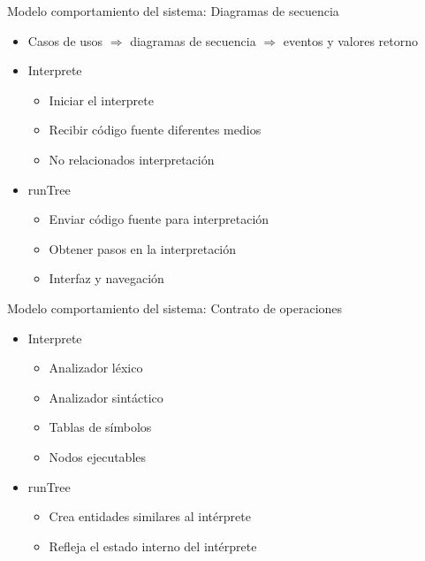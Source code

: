 \documentclass[spanish]{beamer}
\begin{document}
\begin{frame}{Modelo comportamiento del sistema: Diagramas de secuencia}
   \begin{itemize}
      \item Casos de usos $\Rightarrow$ diagramas de secuencia $\Rightarrow$ eventos y valores retorno
      \item Interprete
      \begin{itemize}
         \item Iniciar el interprete
         \item Recibir código fuente diferentes medios
         \item No relacionados interpretación
      \end{itemize}
      \item runTree
      \begin{itemize}
         \item Enviar código fuente para interpretación
         \item Obtener pasos en la interpretación 
         \item Interfaz y navegación
      \end{itemize}
   \end{itemize}
\end{frame}

\begin{frame}{Modelo comportamiento del sistema: Contrato de operaciones}
   \begin{itemize}
      \item Interprete
      \begin{itemize}
         \item Analizador léxico
         \item Analizador sintáctico
         \item Tablas de símbolos
         \item Nodos ejecutables
      \end{itemize}
      \item runTree
      \begin{itemize}
         \item Crea entidades similares al intérprete
         \item Refleja el estado interno del intérprete
      \end{itemize}
   \end{itemize}
\end{frame}
\end{document}
